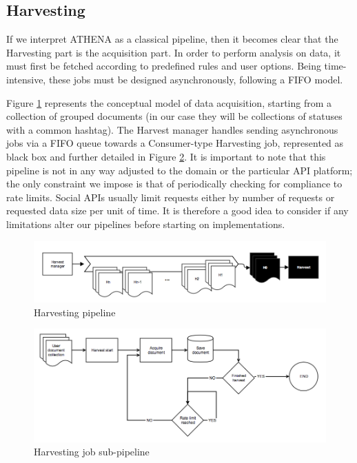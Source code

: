 \subsection{Harvesting}
If we interpret ATHENA as a classical pipeline, then it becomes clear that the Harvesting part is the acquisition part. In order to perform analysis on data, it must first be fetched according to predefined rules and user options. Being time-intensive, these jobs must be designed asynchronously, following a FIFO model.

Figure \ref{fig:harvestpipe1} represents the conceptual model of data acquisition, starting from a collection of grouped documents (in our case they will be collections of statuses with a common hashtag). The Harvest manager handles sending asynchronous jobs via a FIFO queue towards a Consumer-type Harvesting job, represented as black box and further detailed in Figure \ref{fig:harvestpipe}. It is important to note that this pipeline is not in any way adjusted to the domain or the particular API platform; the only constraint we impose is that of periodically checking for compliance to rate limits. Social APIs usually limit requests either by number of requests or requested data size per unit of time. It is therefore a good idea to consider if any limitations alter our pipelines before starting on implementations.

\begin{figure}[ht]
    \centering
\includegraphics[width=\columnwidth]{img/harvestpipe1.png}
    \caption{Harvesting pipeline}
    \label{fig:harvestpipe1}
\end{figure}

\begin{figure}[ht]
    \centering
\includegraphics[width=\columnwidth]{img/harvestpipe.png}
    \caption{Harvesting job sub-pipeline}
    \label{fig:harvestpipe}
\end{figure}

